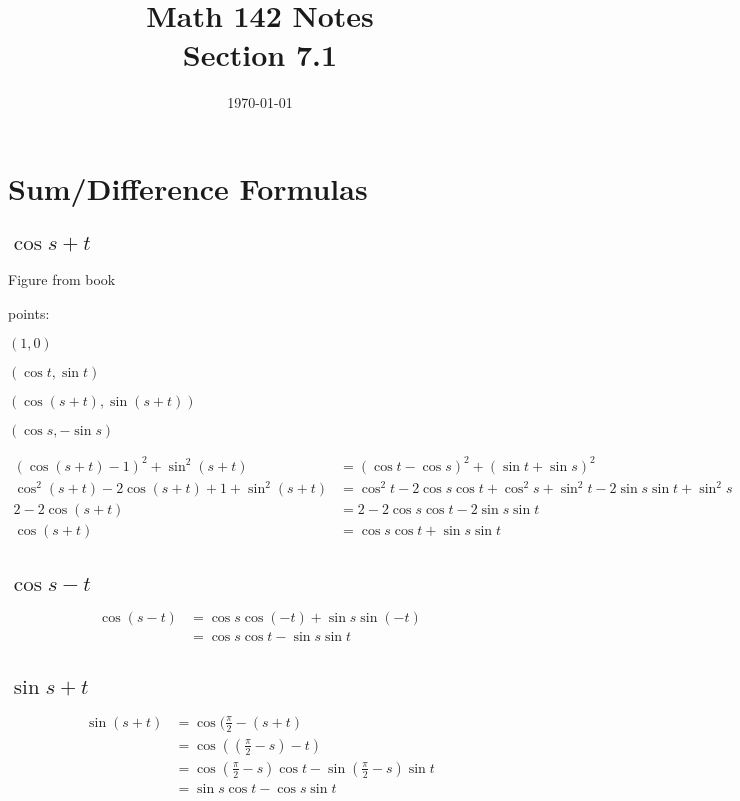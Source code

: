 \documentclass{exam}
\title{Math 142 Notes \\ Section 7.1}
\date{\today}
\begin{document}
  \maketitle
  \tableofcontents

  \section{Sum/Difference Formulas}

  \subsection{$\cos{s + t}$}
  Figure from book

  points:
  \begin{itemize*}
    \item $(1, 0)$
    \item $(\cos t, \sin t)$
    \item $(\cos (s + t), \sin (s + t))$
    \item $(\cos s, - \sin s)$
  \end{itemize*}

  \begin{align*}
    (\cos(s + t) - 1)^2 + \sin^2(s + t)               & = (\cos t - \cos s)^2 + (\sin t + \sin s)^2 \\
    \cos^2(s + t) - 2 \cos(s + t) + 1 + \sin^2(s + t) & = \cos^2 t - 2 \cos s \cos t + \cos^2 s + \sin^2 t - 2 \sin s \sin t + \sin^2 s \\
    2 - 2 \cos(s + t)                                 & = 2 - 2 \cos s \cos t - 2 \sin s \sin t \\
    \cos(s + t)                                       & = \cos s \cos t + \sin s \sin t \\
  \end{align*}

  \subsection{$\cos{s - t}$}
  \begin{align*}
    \cos(s - t) & = \cos s \cos (-t) + \sin s \sin (-t) \\
                & = \cos s \cos t - \sin s \sin t \\
  \end{align*}

  \subsection{$\sin{s + t}$}
  \begin{align*}
    \sin(s + t) & = \cos(\frac{\pi}{2} - (s + t) \\
                & = \cos((\frac{\pi}{2} - s) - t) \\
                & = \cos \left( \frac{\pi}{2} - s \right) \cos t - \sin \left( \frac{\pi}{2} - s \right) \sin t \\
                & = \sin s \cos t - \cos s \sin t \\
  \end{align*}
\end{document}

